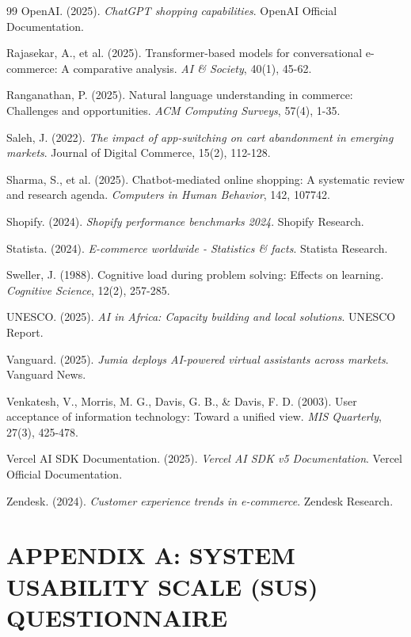 \documentclass[12pt,a4paper]{article}
\begin{document}
\begin{thebibliography}{99}
OpenAI. (2025). \textit{ChatGPT shopping capabilities}. OpenAI Official Documentation.

Rajasekar, A., et al. (2025). Transformer-based models for conversational e-commerce: A comparative analysis. \textit{AI \& Society}, 40(1), 45-62.

Ranganathan, P. (2025). Natural language understanding in commerce: Challenges and opportunities. \textit{ACM Computing Surveys}, 57(4), 1-35.

Saleh, J. (2022). \textit{The impact of app-switching on cart abandonment in emerging markets}. Journal of Digital Commerce, 15(2), 112-128.

Sharma, S., et al. (2025). Chatbot-mediated online shopping: A systematic review and research agenda. \textit{Computers in Human Behavior}, 142, 107742.

Shopify. (2024). \textit{Shopify performance benchmarks 2024}. Shopify Research.

Statista. (2024). \textit{E-commerce worldwide - Statistics \& facts}. Statista Research.

Sweller, J. (1988). Cognitive load during problem solving: Effects on learning. \textit{Cognitive Science}, 12(2), 257-285.

UNESCO. (2025). \textit{AI in Africa: Capacity building and local solutions}. UNESCO Report.

Vanguard. (2025). \textit{Jumia deploys AI-powered virtual assistants across markets}. Vanguard News.

Venkatesh, V., Morris, M. G., Davis, G. B., \& Davis, F. D. (2003). User acceptance of information technology: Toward a unified view. \textit{MIS Quarterly}, 27(3), 425-478.

Vercel AI SDK Documentation. (2025). \textit{Vercel AI SDK v5 Documentation}. Vercel Official Documentation.

Zendesk. (2024). \textit{Customer experience trends in e-commerce}. Zendesk Research.

\end{thebibliography}

\newpage

\appendix
\section{APPENDIX A: SYSTEM USABILITY SCALE (SUS) QUESTIONNAIRE}
\end{document}
